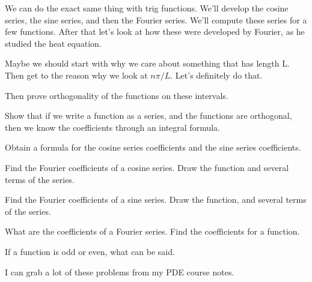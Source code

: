 We can do the exact same thing with trig functions.  We'll develop the cosine series, the sine series, and then the Fourier series. We'll compute these series for a few functions.  After that let's look at how these were developed by Fourier, as he studied the heat equation.

Maybe we should start with why we care about something that has length L. Then get to the reason why we look at $n\pi/L$.  Let's definitely do that.   

Then prove orthogonality of the functions on these intervals.

Show that if we write a function as a series, and the functions are orthogonal, then we know the coefficients through an integral formula.

Obtain a formula for the cosine series coefficients and the sine series coefficients.

Find the Fourier coefficients of a cosine series. Draw the function and several terms of the series. 

Find the Fourier coefficients of a sine series. Draw the function, and several terms of the series. 

What are the coefficients of a Fourier series. Find the coefficients for a function.

If a function is odd or even, what can be said.

I can grab a lot of these problems from my PDE course notes. 





